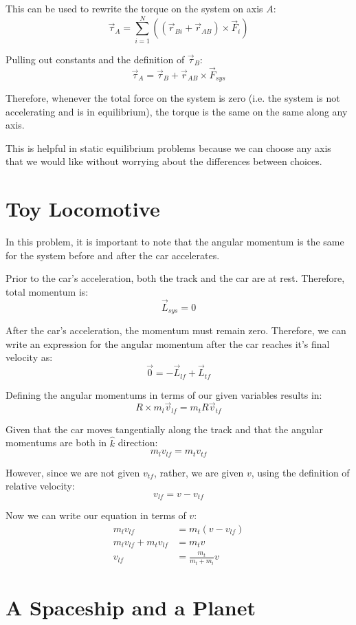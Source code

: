 \documentclass{article}
\begin{document}
This can be used to rewrite the torque on the system on axis $A$:
$$\vec{\tau}_A = \sum \limits_{i=1}^{N} \left( \left( \vec{r}_{Bi} + \vec{r}_{AB}
\right) \times \vec{F}_i \right)$$

Pulling out constants and the definition of $\vec{\tau}_{B}$:
$$\vec{\tau}_A = \vec{\tau}_B + \vec{r}_{AB} \times \vec{F}_{sys}$$

Therefore, whenever the total force on the system is zero (i.e. the system is
not accelerating and is in equilibrium), the torque is the same on the same
along any axis. 

This is helpful in static equilibrium problems because we can choose any axis
that we would like without worrying about the differences between choices.

\section{Toy Locomotive}

In this problem, it is important to note that the angular momentum is the same
for the system before and after the car accelerates.

Prior to the car's acceleration, both the track and the car are at rest.
Therefore, total momentum is: 
$$\vec{L}_{sys} = 0$$

After the car's acceleration, the momentum must remain zero. Therefore, we can
write an expression for the angular momentum after the car reaches it's final
velocity as:
$$\vec{0} = -\vec{L}_{lf} + \vec{L}_{tf}$$

Defining the angular momentums in terms of our given variables results in:
$$R \times m_l \vec{v}_{lf} = m_t R \vec{v}_{tf}$$

Given that the car moves tangentially along the track and that the angular
momentums are both in $\hat{k}$ direction:
$$m_l v_{lf} = m_t v_{tf}$$

However, since we are not given $v_{tf}$, rather, we are given $v$, using the
definition of relative velocity:
$$v_{lf} = v - v_{tf}$$

Now we can write our equation in terms of $v$:
\begin{align*}
    m_l v_{lf} &= m_t \left( v - v_{lf} \right) \\
    m_l v_{lf} + m_t v_{lf} &= m_t v \\
    v_{lf} &= \frac{m_t}{m_t + m_l} v
\end{align*}

\section{A Spaceship and a Planet}
\end{document}
